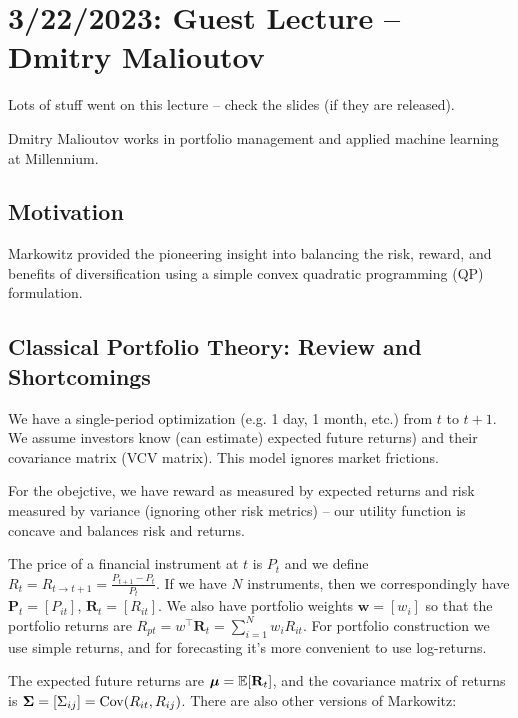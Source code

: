\chapter{3/22/2023: Guest Lecture -- Dmitry Malioutov}
Lots of stuff went on this lecture -- check the slides (if they are released).

\iffalse
Dmitry Malioutov works in portfolio management and applied machine learning at Millennium.

\section{Motivation}
Markowitz provided the pioneering insight into balancing the risk, reward, and benefits of diversification using a simple convex quadratic programming (QP) formulation.

\section{Classical Portfolio Theory: Review and Shortcomings}
We have a single-period optimization (e.g. 1 day, 1 month, etc.) from $t$ to $t+1$. We assume investors know (can estimate) expected future returns) and their covariance matrix (VCV matrix). This model ignores market frictions.

For the obejctive, we have reward as measured by expected returns and risk measured by variance (ignoring other risk metrics) -- our utility function is concave and balances risk and returns.

The price of a financial instrument at $t$ is $P_t$ and we define $R_t = R_{t\to t+1} = \frac{P_{t+1}-P_t}{P_t}$. If we have $N$ instruments, then we correspondingly have $\mathbf P_t = [P_{it}]$, $\mathbf R_t = [R_{it}]$. We also have portfolio weights $\mathbf w=[w_i]$ so that the portfolio returns are $R_{pt} = w^\top\mathbf R_t = \sum_{i=1}^N w_iR_{it}$. For portfolio construction we use simple returns, and for forecasting it's more convenient to use log-returns.

The expected future returns are $\boldsymbol{\mu}=\mathbb E[\mathbf R_t]$, and the covariance matrix of returns is $\boldsymbol{\Sigma} = [\Sigma_{ij}] = \operatorname{Cov}(R_{it},R_{ij})$. 
 There are also other versions of Markowitz:

